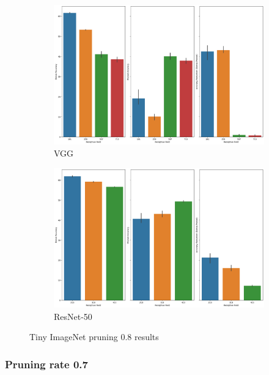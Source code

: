 \begin{figure}[h]
 \centering
     \begin{subfigure}[b]{\columnwidth}
    \includegraphics[width=1.1\columnwidth]{images/Supplementary_material/tiny_imagenet_vgg19_pruning_results_0.8.png}
    \caption{VGG}
    \label{subfig:vgg19CIfar10PR0.8}
     \end{subfigure}
      \hfill
     \begin{subfigure}[b]{\columnwidth}
    \includegraphics[width=1.1\columnwidth]{images/Supplementary_material/tiny_imagenet_resnet50_pruning_results_0.8.png}
    \caption{ResNet-50}
    \label{subfig:resenet50CIfar10PR0.8}
     \end{subfigure}
     \caption{ Tiny ImageNet pruning 0.8 results}
    \label{fig:pr_0.8_tiny_imagenet}
\end{figure}

\subsubsection*{Pruning rate 0.7}

